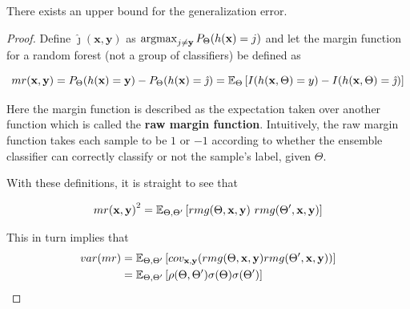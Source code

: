 
\begin{theorem}
There exists an upper bound for the generalization error.
\end{theorem}


\begin{proof}
	Define $\hat{\jmath}( \textbf{x},\textbf{y})$ as $\operatorname*{argmax}_{j \neq \textbf{y}} P_{\Theta}(h(\textbf{x}) = j)$ and let the margin function for a random forest (not a group of classifiers) be defined as

	\[\label{eq:rf-marginFunRf}
	mr(\textbf{x},\textbf{y}) = P_{\Theta}(h(\textbf{x}) = \textbf{y}) - P_{\Theta}(h(\textbf{x}) = \hat{\jmath})
	\\
	= \operatorname{\mathbb{E}}_{\Theta} \left[ I(h(\textbf{x},\Theta ) = y ) - I( h( \textbf{x},\Theta ) = \hat{\jmath} ) \right]
	\]




	Here the margin function is described as the expectation taken over another function which is called the \textbf{raw margin function}\label{eq:rf-rawMarginFun}.
    Intuitively, the raw margin function takes each sample to be $1$ or $-1$ according to whether the ensemble classifier can correctly classify or not the sample's label, given $\Theta$.

	With these definitions, it is straight to see that

            \begin{equation}
            {mr( \textbf{x},\textbf{y} )}^2 = \Expect_{\Theta, \Theta'} \left[ rmg( \Theta,\textbf{x},\textbf{y} ) \ rmg(\Theta',\textbf{x},\textbf{y} ) \right]
            \end{equation}


	This in turn implies that
            \begin{equation}\label{eq:rf-marginFunVar}
	            \begin{split}
	            var(mr) & = \operatorname{\mathbb{E}}_{\Theta, \Theta'}
	            \left[
	            cov_{\textbf{x},\textbf{y}}
	            (rmg(\Theta,\textbf{x},\textbf{y} )rmg(\Theta',\textbf{x},\textbf{y} ))
	            \right] \\
	            & = \operatorname{\mathbb{E}}_{\Theta, \Theta'}
	            \left[
	            \rho(\Theta, \Theta')\sigma(\Theta)\sigma(\Theta')
	            \right]
	            \end{split}
            \end{equation}


\end{proof}
